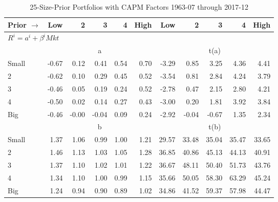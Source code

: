 
\begin{table}[!ht]
\footnotesize
\centering
\caption{25-Size-Prior Portfolios with CAPM Factors 1963-07 through 2017-12}
\begin{tabular}{lrrrrrrrrrr}
  \toprule
    Prior $\rightarrow$ & Low & 2 & 3 & 4 & High & Low & 2 & 3 & 4 & High \\ 
  \midrule
  \multicolumn{11}{l}{$R^i=a^i+\beta^iMkt$} \\

  
    
      & \multicolumn{5}{c}{a} & \multicolumn{5}{c}{t(a)}
    
    \\
      \cmidrule(r){2-6} \cmidrule(r){7-11}

    Small   & -0.67  & 0.12  & 0.41  & 0.54  & 0.70  & -3.29  & 0.85  & 3.25  & 4.36  & 4.41  \\
         2  & -0.62  & 0.10  & 0.29  & 0.45  & 0.52  & -3.54  & 0.81  & 2.84  & 4.24  & 3.79  \\
         3  & -0.46  & 0.05  & 0.19  & 0.24  & 0.52  & -2.78  & 0.47  & 2.15  & 2.80  & 4.21  \\
         4  & -0.50  & 0.02  & 0.14  & 0.27  & 0.43  & -3.00  & 0.20  & 1.81  & 3.92  & 3.84  \\
    Big     & -0.46  & -0.00  & -0.04  & 0.09  & 0.24  & -2.92  & -0.04  & -0.67  & 1.35  & 2.34  \\

  
    
      & \multicolumn{5}{c}{b} & \multicolumn{5}{c}{t(b)}
    
    \\
      \cmidrule(r){2-6} \cmidrule(r){7-11}

    Small   & 1.37  & 1.06  & 0.99  & 1.00  & 1.21  & 29.57  & 33.48  & 35.04  & 35.47  & 33.65  \\
         2  & 1.46  & 1.13  & 1.03  & 1.05  & 1.28  & 36.85  & 40.86  & 45.13  & 44.13  & 40.91  \\
         3  & 1.37  & 1.10  & 1.02  & 1.01  & 1.22  & 36.67  & 48.11  & 50.40  & 51.73  & 43.76  \\
         4  & 1.34  & 1.10  & 1.00  & 0.99  & 1.15  & 35.66  & 50.05  & 58.30  & 63.29  & 45.24  \\
    Big     & 1.24  & 0.94  & 0.90  & 0.89  & 1.02  & 34.86  & 41.52  & 59.37  & 57.98  & 44.47  \\

  

  \bottomrule
\end{tabular}
\label{tbl:25_Size_Prior_CAPM}
\end{table}